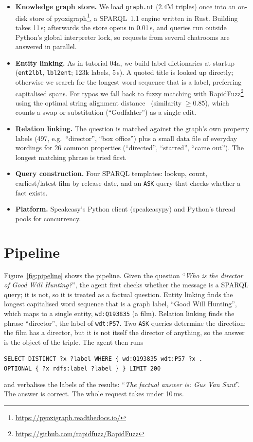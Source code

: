 \documentclass{article}
\begin{document}
\begin{itemize}
    \item \textbf{Knowledge graph store.} We load \texttt{graph.nt} (2.4M triples) once into an on-disk store of pyoxigraph\footnote{\url{https://pyoxigraph.readthedocs.io/}}, a SPARQL~1.1 engine written in Rust. Building takes 11\,s; afterwards the store opens in 0.01\,s, and queries run outside Python's global interpreter lock, so requests from several chatrooms are answered in parallel.
    \item \textbf{Entity linking.} As in tutorial 04a, we build label dictionaries at startup (\texttt{ent2lbl}, \texttt{lbl2ent}; 123k labels, 5\,s). A quoted title is looked up directly; otherwise we search for the longest word sequence that is a label, preferring capitalised spans. For typos we fall back to fuzzy matching with RapidFuzz\footnote{\url{https://github.com/rapidfuzz/RapidFuzz}} using the optimal string alignment distance~\cite{damerau1964technique} (similarity $\geq 0.85$), which counts a swap or substitution (``Godfahter'') as a single edit.
    \item \textbf{Relation linking.} The question is matched against the graph's own property labels (497, e.g.\ ``director'', ``box office'') plus a small data file of everyday wordings for 26 common properties (``directed'', ``starred'', ``came out''). The longest matching phrase is tried first.
    \item \textbf{Query construction.} Four SPARQL templates: lookup, count, earliest/latest film by release date, and an \texttt{ASK} query that checks whether a fact exists.
    \item \textbf{Platform.} Speakeasy's Python client (speakeasypy) and Python's thread pools for concurrency.
\end{itemize}

\section{Pipeline}

Figure~\ref{fig:pipeline} shows the pipeline. Given the question ``\textit{Who is the director of Good Will Hunting?}'', the agent first checks whether the message is a SPARQL query; it is not, so it is treated as a factual question. Entity linking finds the longest capitalised word sequence that is a graph label, ``Good Will Hunting'', which maps to a single entity, \texttt{wd:Q193835} (a film). Relation linking finds the phrase ``director'', the label of \texttt{wdt:P57}. Two \texttt{ASK} queries determine the direction: the film has a director, but it is not itself the director of anything, so the answer is the object of the triple. The agent then runs
\begin{center}
\texttt{SELECT DISTINCT ?x ?label WHERE \{ wd:Q193835 wdt:P57 ?x .}\\
\texttt{OPTIONAL \{ ?x rdfs:label ?label \} \} LIMIT 200}
\end{center}
and verbalises the labels of the results: ``\textit{The factual answer is: Gus Van Sant}''. The answer is correct. The whole request takes under 10\,ms.
\end{document}

